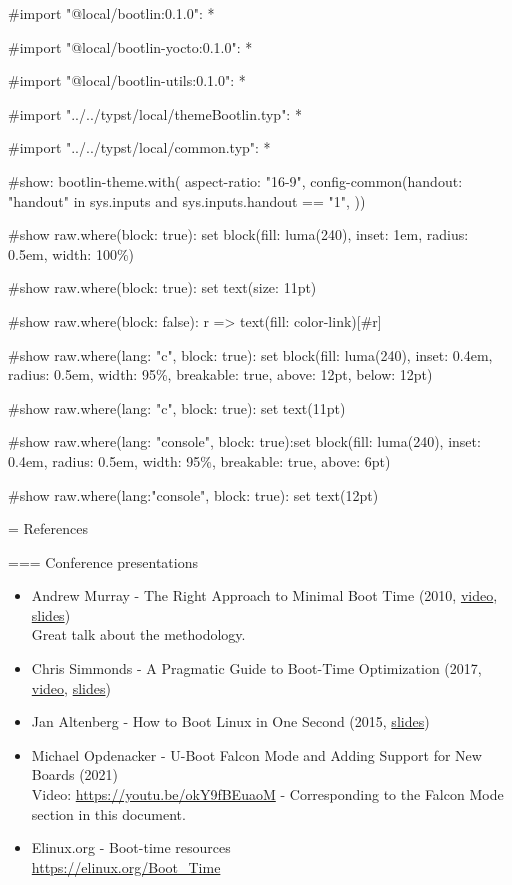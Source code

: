#import "@local/bootlin:0.1.0": *

#import "@local/bootlin-yocto:0.1.0": *

#import "@local/bootlin-utils:0.1.0": *

#import "../../typst/local/themeBootlin.typ": *

#import "../../typst/local/common.typ": *

#show: bootlin-theme.with( aspect-ratio: "16-9", config-common(handout: "handout" in sys.inputs and sys.inputs.handout == "1", ))

#show raw.where(block: true): set block(fill: luma(240), inset: 1em, radius: 0.5em, width: 100\%)

#show raw.where(block: true): set text(size: 11pt)

#show raw.where(block: false): r => text(fill: color-link)[#r]

#show raw.where(lang: "c", block: true): set block(fill: luma(240), inset: 0.4em, radius: 0.5em, width: 95\%, breakable: true, above: 12pt, below: 12pt)

#show raw.where(lang: "c", block: true): set text(11pt)

#show raw.where(lang: "console", block: true):set block(fill: luma(240), inset: 0.4em, radius: 0.5em, width: 95\%, breakable: true, above: 6pt)

#show raw.where(lang:"console", block: true): set text(12pt)

 = References

=== Conference presentations
\small
\begin{itemize}
\item Andrew Murray - The Right Approach to Minimal Boot Time (2010,
      \href{https://bootlin.com/pub/video/2010/elce/elce2010-murray-boot-time.webm}{video},
      \href{https://elinux.org/images/f/f7/RightApproachMinimalBootTimes.pdf}{slides}) \\
      Great talk about the methodology.
\item Chris Simmonds - A Pragmatic Guide to Boot-Time Optimization (2017,
      \href{https://youtu.be/gIK1he6Ocpg}{video},
      \href{https://elinux.org/images/6/64/Chris-simmonds-boot-time-elce-2017_0.pdf}{slides})
\item Jan Altenberg - How to Boot Linux in One Second (2015,
      \href{https://www.elinux.org/images/9/97/Boot_one_second_altenberg.pdf}{slides})
\item Michael Opdenacker - U-Boot Falcon Mode and Adding Support for New Boards (2021)\\
      Video: \url{https://youtu.be/okY9fBEuaoM} - Corresponding to the Falcon Mode section in this document.
\item Elinux.org - Boot-time resources\\
      \url{https://elinux.org/Boot_Time}
\end{itemize}


